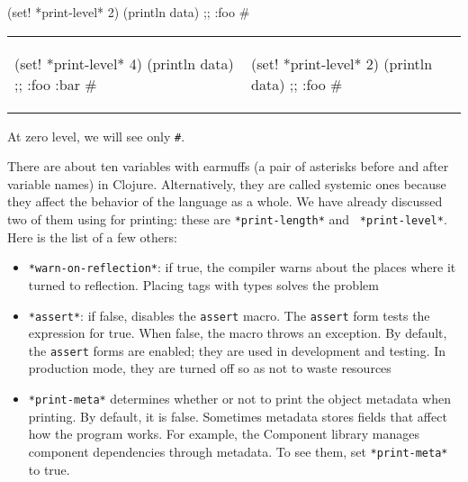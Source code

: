 \splitter

\begin{clojure}
(set! *print-level* 2)
(println data)
;; {:foo #}
\end{clojure}

\else

\noindent
\begin{tabular}{ @{}p{5cm} @{}p{5cm} }


\begin{clojure}
(set! *print-level* 4)
(println data)
;; {:foo {:bar #}}
\end{clojure}

&

\begin{clojure}
(set! *print-level* 2)
(println data)
;; {:foo #}
\end{clojure}

\end{tabular}


\fi

\noindent
At zero level, we will see only \verb|#|.

There are about ten variables with earmuffs (a pair of asterisks before and after variable names) in Clojure. Alternatively, they are called systemic ones because they affect the behavior of the language as a whole. We have already discussed two of them using for printing: these are \verb|*print-length*| and ~\verb|*print-level*|.
Here is the list of a few others:


\begin{itemize}


\item
  \verb|*warn-on-reflection*|: if true, the compiler warns about the places where it turned to reflection. Placing tags with types solves the problem


\item
  \verb|*assert*|: if false, disables the \verb|assert| macro. The \verb|assert| form tests the expression for true. When false, the macro throws an exception. By default, the \verb|assert| forms are enabled; they are used in development and testing. In production mode, they are turned off so as not to waste resources

\label{print-meta}


\item
  \verb|*print-meta*| determines whether or not to print the object metadata when printing.
By default, it is false. Sometimes metadata stores fields that affect how the program works.
For example, the Component library manages component dependencies through metadata.
To see them, set \verb|*print-meta*| to true.

\end{itemize}

